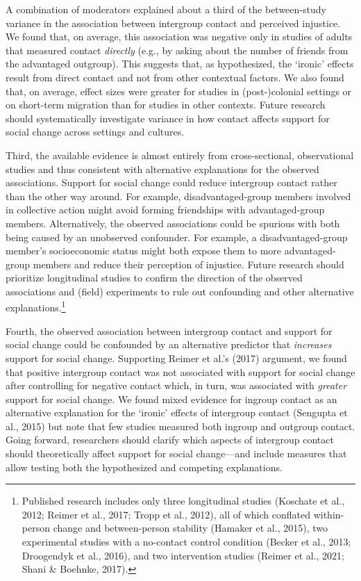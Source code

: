 \documentclass[12pt, letterpaper]{article}
\begin{document}
A combination of moderators explained about a third of the between-study
variance in the association between intergroup contact and perceived
injustice. We found that, on average, this association was negative only
in studies of adults that measured contact \emph{directly} (e.g., by
asking about the number of friends from the advantaged outgroup). This
suggests that, as hypothesized, the `ironic' effects result from direct
contact and not from other contextual factors. We also found that, on
average, effect sizes were greater for studies in (post-)colonial
settings or on short-term migration than for studies in other contexts.
Future research should systematically investigate variance in how
contact affects support for social change across settings and cultures.

Third, the available evidence is almost entirely from cross-sectional,
observational studies and thus consistent with alternative explanations
for the observed associations. Support for social change could reduce
intergroup contact rather than the other way around. For example,
disadvantaged-group members involved in collective action might avoid
forming friendships with advantaged-group members. Alternatively, the
observed associations could be spurious with both being caused by an
unobserved confounder. For example, a disadvantaged-group member's
socioeconomic status might both expose them to more advantaged-group
members and reduce their perception of injustice. Future research should
prioritize longitudinal studies to confirm the direction of the observed
associations and (field) experiments to rule out confounding and other
alternative explanations.\footnote{Published research includes only
  three longitudinal studies (Koschate et al., 2012; Reimer et al.,
  2017; Tropp et al., 2012), all of which conflated within-person change
  and between-person stability (Hamaker et al., 2015), two experimental
  studies with a no-contact control condition (Becker et al., 2013;
  Droogendyk et al., 2016), and two intervention studies (Reimer et al.,
  2021; Shani \& Boehnke, 2017).}

Fourth, the observed association between intergroup contact and support
for social change could be confounded by an alternative predictor that
\emph{increases} support for social change. Supporting Reimer et al.'s
(2017) argument, we found that positive intergroup contact was not
associated with support for social change after controlling for negative
contact which, in turn, was associated with \emph{greater} support for
social change. We found mixed evidence for ingroup contact as an
alternative explanation for the `ironic' effects of intergroup contact
(Sengupta et al., 2015) but note that few studies measured both ingroup
and outgroup contact. Going forward, researchers should clarify which
aspects of intergroup contact should theoretically affect support for
social change---and include measures that allow testing both the
hypothesized and competing explanations.
\end{document}
